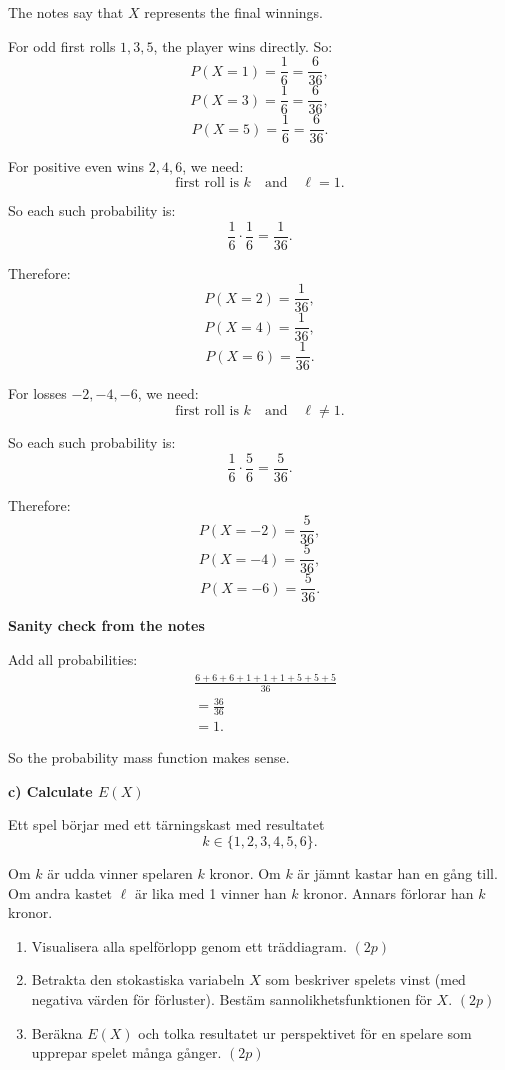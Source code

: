 \documentclass[10pt]{article}
\begin{document}
The notes say that \(X\) represents the final
winnings.

For odd first rolls \(1,3,5\), the player wins
directly. So:
\[
P(X=1)=\frac16=\frac{6}{36},
\]
\[
P(X=3)=\frac16=\frac{6}{36},
\]
\[
P(X=5)=\frac16=\frac{6}{36}.
\]

For positive even wins \(2,4,6\), we need:
\[
\text{first roll is }k
\quad\text{and}\quad
\ell=1.
\]

So each such probability is:
\[
\frac16\cdot\frac16=\frac{1}{36}.
\]

Therefore:
\[
P(X=2)=\frac{1}{36},
\]
\[
P(X=4)=\frac{1}{36},
\]
\[
P(X=6)=\frac{1}{36}.
\]

For losses \(-2,-4,-6\), we need:
\[
\text{first roll is }k
\quad\text{and}\quad
\ell\ne 1.
\]

So each such probability is:
\[
\frac16\cdot\frac56=\frac{5}{36}.
\]

Therefore:
\[
P(X=-2)=\frac{5}{36},
\]
\[
P(X=-4)=\frac{5}{36},
\]
\[
P(X=-6)=\frac{5}{36}.
\]

\textbf{Sanity check from the notes}

Add all probabilities:
\begin{align*}
&\frac{6+6+6+1+1+1+5+5+5}{36}
\\[2mm]
&=
\frac{36}{36}
\\[2mm]
&=1.
\end{align*}

So the probability mass function makes sense.

\textbf{c) Calculate \(E(X)\)}

Ett spel börjar med ett tärningskast med resultatet
\[
k\in \{1,2,3,4,5,6\}.
\]

Om \(k\) är udda vinner spelaren \(k\) kronor.
Om \(k\) är jämnt kastar han en gång till.
Om andra kastet \(\ell\) är lika med 1 vinner han
\(k\) kronor. Annars förlorar han \(k\) kronor.

\begin{enumerate}[label=\alph*)]
\item Visualisera alla spelförlopp genom ett
träddiagram. \((2p)\)

\item Betrakta den stokastiska variabeln \(X\) som
beskriver spelets vinst (med negativa värden för
förluster). Bestäm sannolikhetsfunktionen för \(X\).
\((2p)\)

\item Beräkna \(E(X)\) och tolka resultatet ur
perspektivet för en spelare som upprepar spelet
många gånger. \((2p)\)
\end{enumerate}
\end{document}
